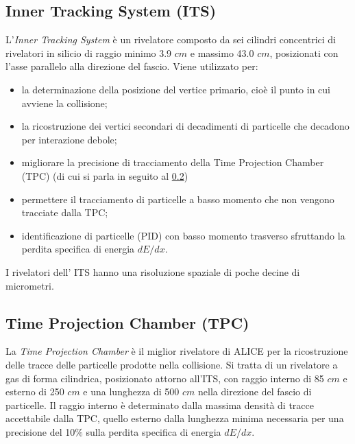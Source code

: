     \subsection{Inner Tracking System (ITS)} \label{ITS}
    L'\textit{Inner Tracking System} è un rivelatore composto da sei cilindri concentrici di rivelatori in silicio di raggio minimo 3.9 $cm$ e massimo 43.0 $cm$, posizionati con l'asse parallelo alla direzione del fascio. Viene utilizzato per:
    \begin{itemize}
        \item la determinazione della posizione del vertice primario, cioè il punto in cui avviene la collisione; %
        \item la ricostruzione dei vertici secondari di decadimenti di particelle che decadono per interazione debole; 
        \item migliorare la precisione di tracciamento della Time Projection Chamber (TPC) (di cui si parla in seguito al \ref{TPC})
        \item permettere il tracciamento di particelle a basso momento che non vengono tracciate dalla TPC;
        \item identificazione di particelle (PID) con basso momento trasverso sfruttando la perdita specifica di energia $dE/dx$.
    \end{itemize}
    
    I rivelatori dell' ITS hanno una risoluzione spaziale di poche decine di micrometri. 
    
    \subsection{Time Projection Chamber  (TPC)} \label{TPC}
    La \textit{Time Projection Chamber}  è il miglior rivelatore di ALICE per la ricostruzione delle tracce delle particelle prodotte nella collisione. Si tratta di un rivelatore a gas di forma cilindrica, posizionato attorno all'ITS, con raggio interno di 85 $cm$ e esterno di 250 $cm$ e una lunghezza di 500 $cm$ nella direzione del fascio di particelle. Il raggio interno è determinato dalla massima densità di tracce accettabile dalla TPC, quello esterno dalla lunghezza minima necessaria per una precisione del 10$\%$ sulla perdita specifica di energia $dE/dx$. 
     
